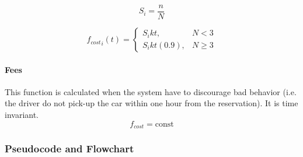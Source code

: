 \documentclass{article}
\begin{document}
				\begin{equation}
					S_{i} = \dfrac {n}{N}
				\end{equation}
				
				\begin{equation}
					{f_{cost}}_{i}(t)= 
					\begin{cases}
					{S_{i}kt},& N < 3\\
					{S_{i}kt(0.9)},& N \geq 3
					\end{cases}
				\end{equation}
				
			\paragraph{Fees} This function is calculated when the system have to discourage bad behavior (i.e. the driver do not pick-up the car within one hour from the reservation). It is time invariant.
				\begin{equation}
				f_{cost}= \text{const} 
				\end{equation}
				
			\subsubsection{Pseudocode and Flowchart}
				
				\begin{minipage}{\linewidth}
				\end{minipage}
				\pagebreak
			
\end{document}
